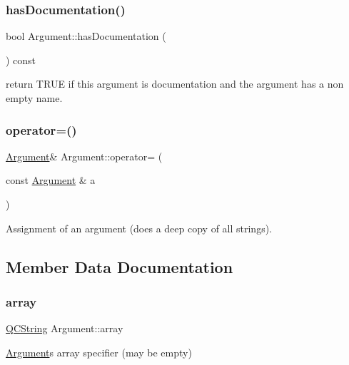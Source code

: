 \subsubsection{\texorpdfstring{hasDocumentation()}{hasDocumentation()}}
{\footnotesize\ttfamily bool Argument\+::has\+Documentation (\begin{DoxyParamCaption}{ }\end{DoxyParamCaption}) const\hspace{0.3cm}{\ttfamily [inline]}}

return T\+R\+UE if this argument is documentation and the argument has a non empty name. \mbox{\label{struct_argument_aeb2dc827f4c8a7f597f714b3995c20e4}} 
\subsubsection{\texorpdfstring{operator=()}{operator=()}}
{\footnotesize\ttfamily \mbox{\hyperlink{struct_argument}{Argument}}\& Argument\+::operator= (\begin{DoxyParamCaption}\item[{const \mbox{\hyperlink{struct_argument}{Argument}} \&}]{a }\end{DoxyParamCaption})\hspace{0.3cm}{\ttfamily [inline]}}

Assignment of an argument (does a deep copy of all strings). 

\subsection{Member Data Documentation}
\mbox{\label{struct_argument_a9e33101befb3a977ac863d8a595ed210}} 
\subsubsection{\texorpdfstring{array}{array}}
{\footnotesize\ttfamily \mbox{\hyperlink{class_q_c_string}{Q\+C\+String}} Argument\+::array}

\mbox{\hyperlink{struct_argument}{Argument}}\textquotesingle{}s array specifier (may be empty) \mbox{\label{struct_argument_aff930f2a4cb85b5616be79b81db2341f}} 
